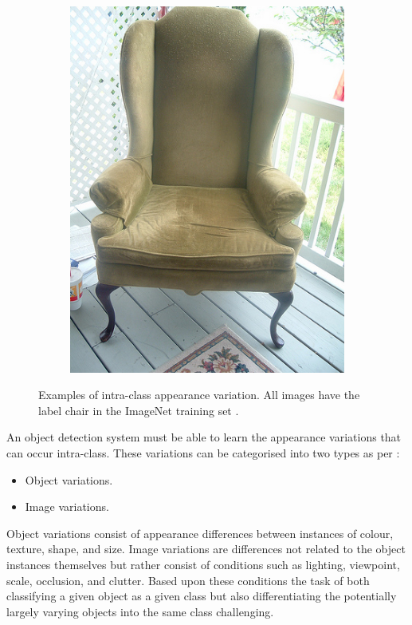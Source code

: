 \begin{figure}[H]
\begin{subfigure}[b]{0.2\textwidth}
        \includegraphics[width=\textwidth]{Figs/Problem/chair4.jpeg}
        \caption{}
    \end{subfigure}
    \caption{Examples of intra-class appearance variation. All images have the label chair in the ImageNet training set \cite{imagenet}.}
    \label{fig:intra_ex}
\end{figure} 

An object detection system must be able to learn  the appearance variations that can occur intra-class. These variations can be categorised into two types as per \cite{schroff}:

\begin{itemize}
	\item Object variations.
	\item Image variations.
\end{itemize}

Object variations consist of appearance differences between instances of colour, texture, shape, and size. Image variations are differences not related to the object instances themselves but rather consist of conditions such as lighting, viewpoint, scale, occlusion, and clutter. Based upon these conditions the task of both classifying a given object as a given class but also differentiating the potentially largely varying objects into the same class challenging.

